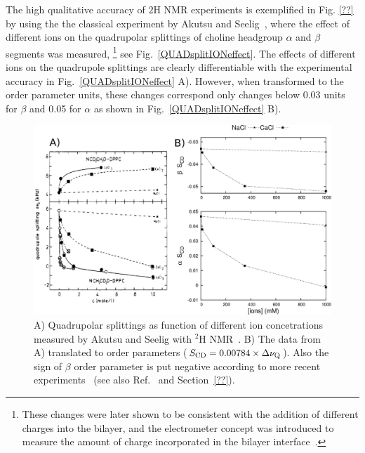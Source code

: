 \documentclass[aps,prl,superscriptaddress,twocolumn]{revtex4}
\begin{document}
The high qualitative accuracy of $ 2$H NMR experiments is exemplified in Fig. \ref{??} by using the
the classical experiment by Akutsu and Seelig~\cite{akutsu81}, where the effect of different ions on 
the quadrupolar splittings of choline headgroup $\alpha$ and $\beta$ segments was measured, 
\footnote{These changes were later shown to be consistent with the addition of different charges into the bilayer, and the electrometer 
concept was introduced to measure the amount of charge incorporated in the bilayer interface~\cite{scherer89}.}
see Fig.~\ref{QUADsplitIONeffect}. 
The effects of different ions on the quadrupole splittings are clearly differentiable with the experimental 
accuracy in Fig.~\ref{QUADsplitIONeffect} A). However, when transformed to the order parameter units, 
these changes correspond only changes below 0.03 units for $\beta$ and 0.05 for $\alpha$ as shown in 
Fig.~\ref{QUADsplitIONeffect} B). 
\begin{figure}[]
  \includegraphics[width=17.2cm]{../Fig/QPandOPwithIONS.eps}
  \caption{\label{opIONeffect}
    A) Quadrupolar splittings as function of different ion concetrations measured by Akutsu and Seelig with $^2$H NMR~\cite{akutsu81}. 
    B) The data from A) translated to order parameters ($S_{{\rm CD}}=0.00784 \times \Delta \nu_{{\rm Q}}$). Also the sign of $\beta$ order parameter is put negative according
    to more recent experiments~\cite{??} (see also Ref.~\cite{botan15} and Section~\ref{??}).
  } 
\end{figure}
\end{document}
